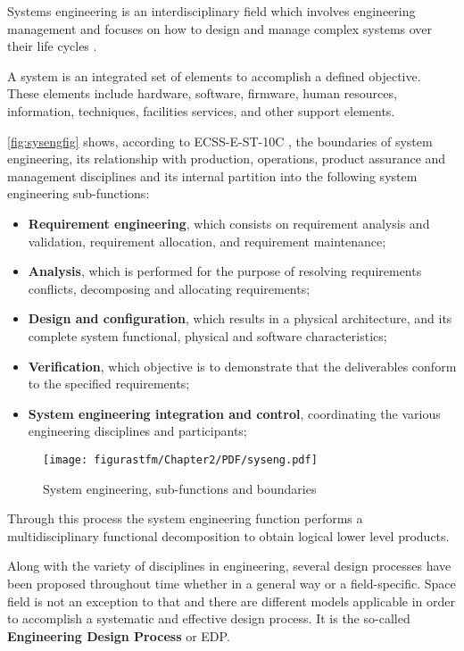 Systems engineering is an interdisciplinary field which involves engineering management and focuses on how to design and manage complex systems over their life cycles \cite{wiki}.

A system is an integrated set of elements to accomplish a defined objective. These elements include  hardware, software, firmware, human resources, information, techniques, facilities services, and other support elements.

 \autoref{fig:sysengfig} shows, according to ECSS-E-ST-10C \cite{ESASYSENG}, the boundaries of system engineering, its relationship with production, operations, product assurance and management disciplines and its internal partition into the following system engineering sub-functions:

\begin{itemize}

	\item{\textbf{Requirement engineering}, which consists on requirement analysis and validation, requirement allocation, and requirement maintenance;}
	\item{\textbf{Analysis}, which is performed for the purpose of resolving requirements conflicts, decomposing and allocating requirements;}
	\item{\textbf{Design and configuration}, which results in a physical architecture, and its complete system functional, physical and software characteristics;}
	\item{\textbf{Verification}, which objective is to demonstrate that the deliverables conform to the specified requirements;}
	\item{\textbf{System engineering integration and control}, coordinating the various engineering disciplines and participants;}

	\end{itemize}

			\begin{figure}[h]
			\centering
			\texttt{[image: figurastfm/Chapter2/PDF/syseng.pdf]}
			\caption{System engineering, sub-functions and boundaries \cite{ESASYSENG}}
			\label{fig:sysengfig}
			\end{figure}

Through this process the system engineering function performs a multidisciplinary functional decomposition to obtain logical lower level products.

Along with the variety of disciplines in engineering, several design processes have been proposed throughout time whether in a general way or a field-specific. Space field is not an exception to that and there are different models applicable in order to accomplish a systematic and effective design process. It is the so-called \textbf{Engineering Design Process} or \acrshort{EDP}.

